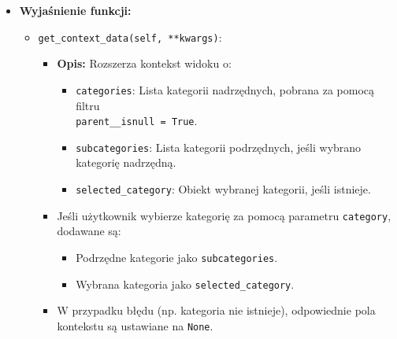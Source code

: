 \documentclass[12pt,a4paper,oneside]{article}
\theoremstyle{definition}
\numberwithin{equation}{section}
\begin{document}
\begin{itemize}
    \item \textbf{Wyjaśnienie funkcji:}
    \begin{itemize}
        \item \texttt{get\_context\_data(self, **kwargs)}:
        \begin{itemize}
            \item \textbf{Opis:} Rozszerza kontekst widoku o:
            \begin{itemize}
                \item \texttt{categories}: Lista kategorii nadrzędnych, pobrana za pomocą filtru\\ \texttt{parent\_\_isnull = True}.
                \item \texttt{subcategories}: Lista kategorii podrzędnych, jeśli wybrano kategorię nadrzędną.
                \item \texttt{selected\_category}: Obiekt wybranej kategorii, jeśli istnieje.
            \end{itemize}
            \item Jeśli użytkownik wybierze kategorię za pomocą parametru \texttt{category}, dodawane są:
            \begin{itemize}
                \item Podrzędne kategorie jako \texttt{subcategories}.
                \item Wybrana kategoria jako \texttt{selected\_category}.
            \end{itemize}
            \item W przypadku błędu (np. kategoria nie istnieje), odpowiednie pola kontekstu są ustawiane na \texttt{None}.
        \end{itemize}
    \end{itemize}
\end{itemize}



\label{CategoryProductsView}
\end{document}
